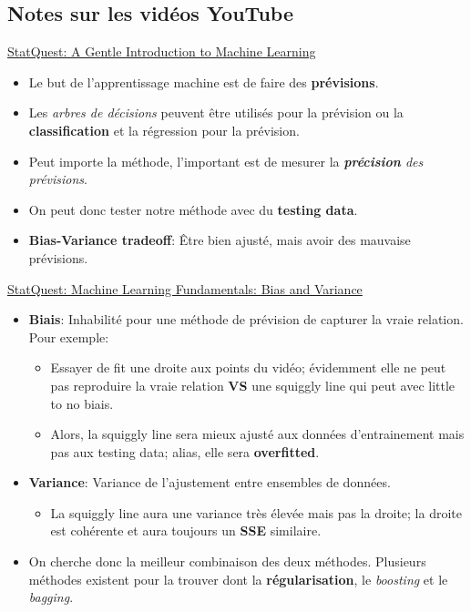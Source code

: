 \documentclass[12pt, titlepage, french]{report}
\begin{document}
\subsection{Notes sur les vidéos YouTube}

\begin{YTB_SUMM}{\href{https://www.youtube.com/watch?v=Gv9_4yMHFhI&list=PLblh5JKOoLUICTaGLRoHQDuF_7q2GfuJF&index=2&t=0s}{StatQuest: A Gentle Introduction to Machine Learning}}
\begin{itemize}
	\item	Le but de l'apprentissage machine est de faire des \textbf{prévisions}. 
	\item	Les \textit{arbres de décisions} peuvent être utilisés pour la prévision ou la \textbf{classification} et la régression pour la prévision.
	\item	Peut importe la méthode, l'important est de mesurer la \textit{\textbf{précision} des prévisions}.
	\item	On peut donc tester notre méthode avec du \textbf{testing data}.
	\item	\textbf{Bias-Variance tradeoff}: Être bien ajusté, mais avoir des mauvaise prévisions.
\end{itemize}
\end{YTB_SUMM}

\begin{YTB_SUMM}{\href{https://www.youtube.com/watch?v=EuBBz3bI-aA&list=PLblh5JKOoLUICTaGLRoHQDuF_7q2GfuJF&index=6}{StatQuest: Machine Learning Fundamentals: Bias and Variance}}
\begin{itemize}
	\item	\textbf{Biais}: Inhabilité pour une méthode de prévision de capturer la vraie relation. Pour exemple:
	\begin{itemize}
		\item	Essayer de fit une droite aux points du vidéo; évidemment elle ne peut pas reproduire la vraie relation \textbf{VS} une squiggly line qui peut avec little to no biais.
		\item	Alors, la squiggly line sera mieux ajusté aux données d'entrainement mais pas aux testing data; alias, elle sera \textbf{overfitted}.
	\end{itemize}
	\item	\textbf{Variance}: Variance de l'ajustement entre ensembles de données.
	\begin{itemize}
		\item	La squiggly line aura une variance très élevée mais pas la droite; la droite est cohérente et aura toujours un \textbf{SSE} similaire.
	\end{itemize}
	\item	On cherche donc la meilleur combinaison des deux méthodes. Plusieurs méthodes existent pour la trouver dont la \textbf{régularisation}, le \textit{boosting} et le \textit{bagging}.
\end{itemize}
\end{YTB_SUMM}
\end{document}

